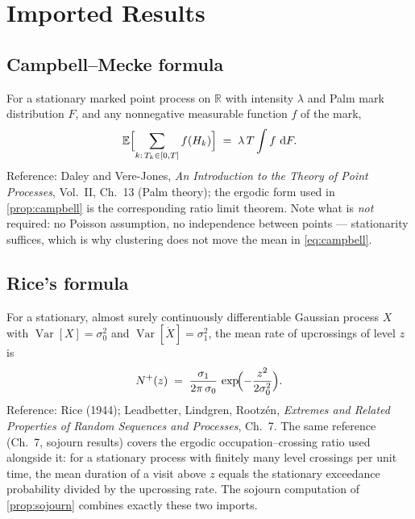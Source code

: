 \documentclass[11pt, a4paper]{article}
\theoremstyle{definition}
\theoremstyle{plain}
\theoremstyle{remark}
\newcommand{\R}{\mathbb{R}}
\newcommand{\E}{\mathbb{E}}
\newcommand{\Var}{\operatorname{Var}}
\newcommand{\dd}{\,\mathrm{d}}
\begin{document}
\section{Imported Results}\label{sec:app-imported}

\subsection{Campbell--Mecke formula}\label{sec:app-campbell}
For a stationary marked point process on $\R$ with intensity $\lambda$
and Palm mark distribution $F$, and any nonnegative measurable function
$f$ of the mark,
\[
  \E\Bigl[\sum_{k:\,T_k\in[0,T]} f(H_k)\Bigr] \;=\; \lambda\,T
  \int f\,\dd F .
\]
Reference: Daley and Vere-Jones, \emph{An Introduction to the Theory of
Point Processes}, Vol.~II, Ch.~13 (Palm theory); the ergodic form used
in \cref{prop:campbell} is the corresponding ratio limit theorem.  Note
what is \emph{not} required: no Poisson assumption, no independence
between points --- stationarity suffices, which is why clustering does
not move the mean in \cref{eq:campbell}.

\subsection{Rice's formula}\label{sec:app-rice}
For a stationary, almost surely continuously differentiable Gaussian
process $X$ with $\Var[X] = \sigma_0^2$ and $\Var[\dot X] = \sigma_1^2$,
the mean rate of upcrossings of level $z$ is
\[
  N^+(z) \;=\; \frac{\sigma_1}{2\pi\,\sigma_0}\,
  \exp\!\Bigl(-\frac{z^2}{2\sigma_0^2}\Bigr).
\]
Reference: Rice (1944); Leadbetter, Lindgren, Rootz\'en,
\emph{Extremes and Related Properties of Random Sequences and
Processes}, Ch.~7.  The same reference (Ch.~7, sojourn results) covers
the ergodic occupation--crossing ratio used alongside it: for a
stationary process with finitely many level crossings per unit time,
the mean duration of a visit above $z$ equals the stationary
exceedance probability divided by the upcrossing rate.  The sojourn
computation of \cref{prop:sojourn} combines exactly these two
imports.
\end{document}
